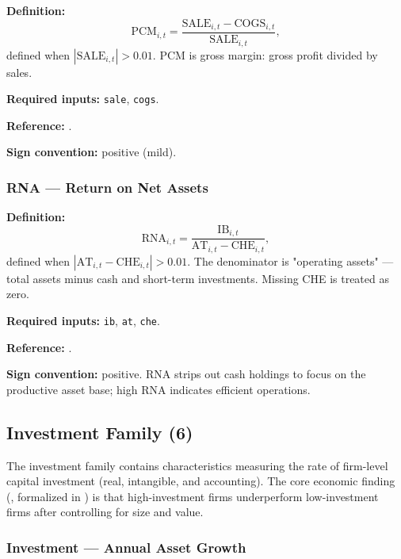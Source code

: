 \textbf{Definition:}
\begin{equation}
\mathrm{PCM}_{i,t} = \frac{\mathrm{SALE}_{i,t} - \mathrm{COGS}_{i,t}}
                          {\mathrm{SALE}_{i,t}},
\label{eq:pcm}
\end{equation}
defined when $|\mathrm{SALE}_{i,t}| > 0.01$. PCM is gross margin: gross
profit divided by sales.

\textbf{Required inputs:} \texttt{sale}, \texttt{cogs}.

\textbf{Reference:} \cite{Gorodnichenko2010}.

\textbf{Sign convention:} positive (mild).

\subsubsection{RNA --- Return on Net Assets}

\textbf{Definition:}
\begin{equation}
\mathrm{RNA}_{i,t} = \frac{\mathrm{IB}_{i,t}}{\mathrm{AT}_{i,t} - \mathrm{CHE}_{i,t}},
\label{eq:rna}
\end{equation}
defined when $|\mathrm{AT}_{i,t} - \mathrm{CHE}_{i,t}| > 0.01$. The
denominator is "operating assets" --- total assets minus cash and short-term
investments. Missing CHE is treated as zero.

\textbf{Required inputs:} \texttt{ib}, \texttt{at}, \texttt{che}.

\textbf{Reference:} \cite{SoliFridson1995}.

\textbf{Sign convention:} positive. RNA strips out cash holdings to
focus on the productive asset base; high RNA indicates efficient
operations.

\subsection{Investment Family (6)}
\label{subsec:stage0-investment}

The investment family contains characteristics measuring the rate of
firm-level capital investment (real, intangible, and accounting). The
core economic finding (\citealp{CooperGulenSchill2008}, formalized in
\citealp{HouXueZhang2015,FamaFrench2015}) is that high-investment firms
underperform low-investment firms after controlling for size and value.

\subsubsection{Investment --- Annual Asset Growth}

